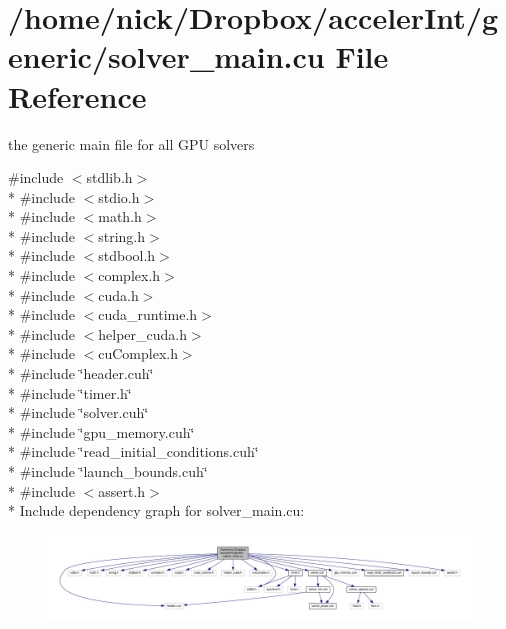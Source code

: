 \hypertarget{solver__main_8cu}{}\section{/home/nick/\+Dropbox/acceler\+Int/generic/solver\+\_\+main.cu File Reference}
\label{solver__main_8cu}


the generic main file for all G\+PU solvers  


{\ttfamily \#include $<$stdlib.\+h$>$}\\*
{\ttfamily \#include $<$stdio.\+h$>$}\\*
{\ttfamily \#include $<$math.\+h$>$}\\*
{\ttfamily \#include $<$string.\+h$>$}\\*
{\ttfamily \#include $<$stdbool.\+h$>$}\\*
{\ttfamily \#include $<$complex.\+h$>$}\\*
{\ttfamily \#include $<$cuda.\+h$>$}\\*
{\ttfamily \#include $<$cuda\+\_\+runtime.\+h$>$}\\*
{\ttfamily \#include $<$helper\+\_\+cuda.\+h$>$}\\*
{\ttfamily \#include $<$cu\+Complex.\+h$>$}\\*
{\ttfamily \#include \char`\"{}header.\+cuh\char`\"{}}\\*
{\ttfamily \#include \char`\"{}timer.\+h\char`\"{}}\\*
{\ttfamily \#include \char`\"{}solver.\+cuh\char`\"{}}\\*
{\ttfamily \#include \char`\"{}gpu\+\_\+memory.\+cuh\char`\"{}}\\*
{\ttfamily \#include \char`\"{}read\+\_\+initial\+\_\+conditions.\+cuh\char`\"{}}\\*
{\ttfamily \#include \char`\"{}launch\+\_\+bounds.\+cuh\char`\"{}}\\*
{\ttfamily \#include $<$assert.\+h$>$}\\*
Include dependency graph for solver\+\_\+main.\+cu\+:
\nopagebreak
\begin{figure}[H]
\begin{center}
\leavevmode
\includegraphics[width=350pt]{solver__main_8cu__incl}
\end{center}
\end{figure}
